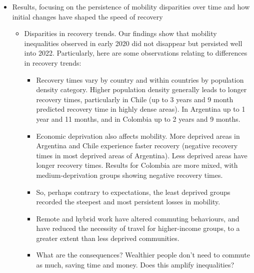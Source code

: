 \documentclass[fleqn,10pt]{letter}
\begin{document}
\begin{itemize}
    \item Results, focusing on the persistence of mobility disparities over time and how initial changes have shaped the speed of recovery
    \begin{itemize}
        \item Disparities in recovery trends. Our findings show that mobility inequalities observed in early 2020 did not disappear but persisted well into 2022. Particularly, here are some observations relating to differences in recovery trends:
        \begin{itemize}
            \item Recovery times vary by country and within countries by population density category. Higher population density generally leads to longer recovery times, particularly in Chile (up to 3 years and 9 month predicted recovery time in highly dense areas). In Argentina up to 1 year and 11 months, and in Colombia up to 2 years and 9 months.
            \item Economic deprivation also affects mobility. More deprived areas in Argentina and Chile experience faster recovery (negative recovery times in most deprived areas of Argentina). Less deprived areas have longer recovery times. Results for Colombia are more mixed, with medium-deprivation groups showing negative recovery times.
            \item So, perhaps contrary to expectations, the least deprived groups recorded the steepest and most persistent losses in mobility.
            \item Remote and hybrid work have altered commuting behaviours, and have reduced the necessity of travel for higher-income groups, to a greater extent than less deprived communities.
            \item What are the consequences? Wealthier people don't need to commute as much, saving time and money. Does this amplify inequalities?
        \end{itemize}
        

\end{itemize}
\end{itemize}
\end{document}
